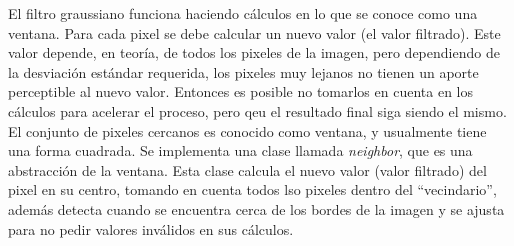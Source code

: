 \documentclass {article}
\begin{document}
El filtro graussiano funciona haciendo cálculos en lo que se conoce como una ventana. Para cada
pixel se debe calcular un nuevo valor (el valor filtrado). Este valor depende, en teoría, de todos
los pixeles de la imagen, pero dependiendo de la desviación estándar requerida, los pixeles muy
lejanos no tienen un aporte perceptible al nuevo valor. Entonces es posible no tomarlos en cuenta en
los cálculos para acelerar el proceso, pero qeu el resultado final siga siendo el mismo. El conjunto
de pixeles cercanos es conocido como ventana, y usualmente tiene una forma cuadrada. Se implementa
una clase llamada \textit{neighbor}, que es una abstracción de la ventana. Esta clase calcula el
nuevo valor (valor filtrado) del pixel en su centro, tomando en cuenta todos lso pixeles dentro del
``vecindario'', además detecta cuando
se encuentra cerca de los bordes de la imagen y se ajusta para no pedir valores inválidos en sus
cálculos.
\end{document}
